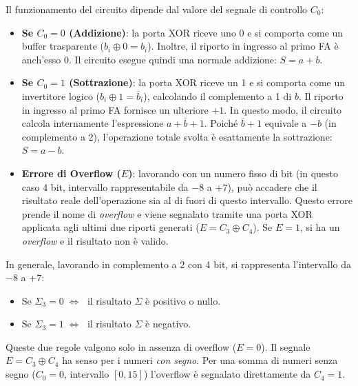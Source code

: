 Il funzionamento del circuito dipende dal valore del segnale di controllo $C_0$:

\begin{itemize}[leftmargin=1.5em]
    \item \textbf{Se $C_0=0$ (Addizione)}: la porta XOR riceve uno 0 e si comporta come un buffer trasparente ($b_i \oplus 0 = b_i$). Inoltre, il riporto in ingresso al primo FA è anch'esso 0. Il circuito esegue quindi una normale addizione: $S = a + b$.
    
    \item \textbf{Se $C_0=1$ (Sottrazione)}: la porta XOR riceve un 1 e si comporta come un invertitore logico ($b_i \oplus 1 = \overline{b}_i$), calcolando il complemento a 1 di $b$. Il riporto in ingresso al primo FA fornisce un ulteriore $+1$. In questo modo, il circuito calcola internamente l'espressione $a + \overline{b} + 1$. Poiché $\overline{b} + 1$ equivale a $-b$ (in complemento a 2), l'operazione totale svolta è esattamente la sottrazione: $S = a - b$.
    
    \item \textbf{Errore di Overflow ($E$)}: lavorando con un numero fisso di bit (in questo caso 4 bit, intervallo rappresentabile da $-8$ a $+7$), può accadere che il risultato reale dell'operazione sia al di fuori di questo intervallo. Questo errore prende il nome di \emph{overflow} e viene segnalato tramite una porta XOR applicata agli ultimi due riporti generati ($E = C_3 \oplus C_4$). Se $E=1$, si ha un \emph{overflow} e il risultato non è valido.
\end{itemize}

In generale, lavorando in complemento a 2 con 4 bit, si rappresenta l'intervallo da $-8$ a $+7$:
\begin{itemize}[leftmargin=1.5em]
    \item[\small$\blacksquare$] Se $\Sigma_3 = 0 \;\Leftrightarrow\;$ il risultato $\Sigma$ è positivo o nullo.
    \item[\small$\blacksquare$] Se $\Sigma_3 = 1 \;\Leftrightarrow\;$ il risultato $\Sigma$ è negativo.
\end{itemize}
Queste due regole valgono solo in assenza di overflow ($E=0$). Il segnale $E=C_3\oplus C_4$ ha senso per i numeri \emph{con segno}. Per una somma di numeri senza segno ($C_0=0$, intervallo $[0,15]$) l'overflow è segnalato direttamente da $C_4=1$.

